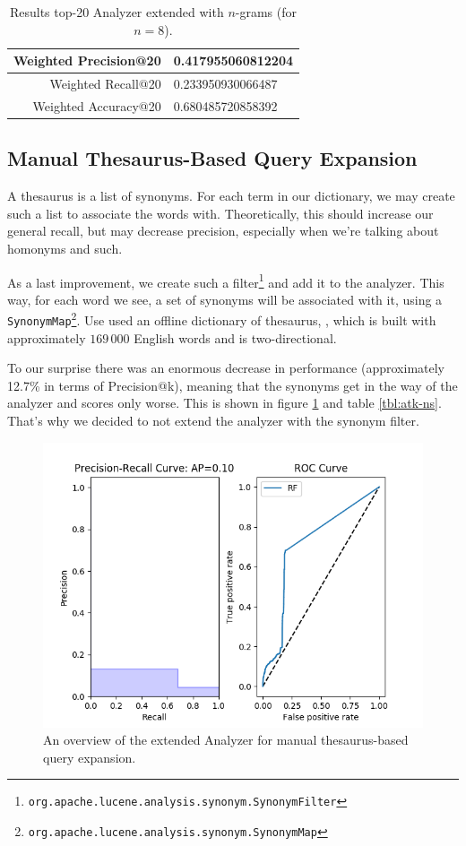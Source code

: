 \documentclass[11pt]{article}
\begin{document}
\begin{table}[htp]
	\centering
	\begin{tabular}{|r|l|}
		\hline
		Weighted \textsf{Precision@20} & 0.417955060812204 \\ \hline
		Weighted \textsf{Recall@20} & 0.233950930066487 \\ \hline
		Weighted \textsf{Accuracy@20} & 0.680485720858392 \\ \hline
	\end{tabular}
	\caption{Results top-20 Analyzer extended with $n$-grams (for $n=8$).}
	\label{tbl:atk-n}
\end{table}

\subsection{Manual Thesaurus-Based Query Expansion}\label{sec:synonyms}
A thesaurus is a list of synonyms. For each term in our dictionary, we may create such a list to associate the words with. Theoretically, this should increase our general recall, but may decrease precision, especially when we're talking about homonyms and such.

As a last improvement, we create such a filter\footnote{\texttt{org.apache.lucene.analysis.synonym.SynonymFilter}} and add it to the analyzer. This way, for each word we see, a set of synonyms will be associated with it, using a \texttt{SynonymMap}\footnote{\texttt{org.apache.lucene.analysis.synonym.SynonymMap}}. Use used an offline dictionary of thesaurus, \cite{synonyms}, which is built with approximately $169\,000$ English words and is two-directional.

To our surprise there was an enormous decrease in performance (approximately 12.7\% in terms of \textsf{Precision@k}), meaning that the synonyms get in the way of the analyzer and scores only worse. This  is shown in figure \ref{fig:synonyms} and table \ref{tbl:atk-ns}. That's why we decided to not extend the analyzer with the synonym filter.
\begin{figure}[htp]
	\centering
	\includegraphics[width=\textwidth]{images/2ndTerm/ExclNgram_afterSynonym}
	\caption{An overview of the extended Analyzer for manual thesaurus-based query expansion.}
	\label{fig:synonyms}
\end{figure}
\end{document}
